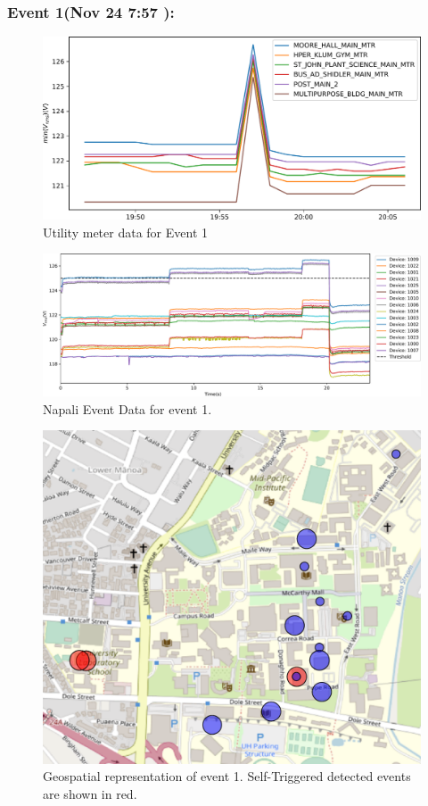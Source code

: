 \subsubsection{Event 1(Nov 24 7:57 ):}
\begin{figure}[!ht]
    \centering
    \includegraphics[width=0.7\linewidth]{img/napali_eval/subthreshold/ev1/ev1_gt.pdf}
    \caption{Utility meter data for Event 1}
    \label{expdes:fig:sub:ev1:gt}
\end{figure}
\begin{figure}[!ht]
    \centering
    \includegraphics[width=1\linewidth]{img/napali_eval/subthreshold/ev1/boxes_combined.pdf}
    \caption{Napali Event Data for event 1.}
    \label{expdes:fig:sub:ev1:boxes}
\end{figure}
\begin{figure}[!ht]
    \centering
    \includegraphics[width=0.7\linewidth]{img/napali_eval/subthreshold/ev1/map.pdf}
    \caption{Geospatial representation of event 1.
    Self-Triggered detected events are shown in red.}
    \label{expdes:fig:sub:ev1:map}
\end{figure}

